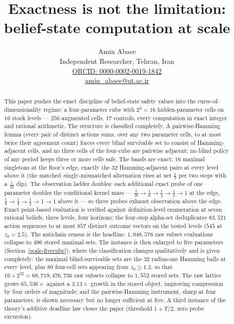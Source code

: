 \documentclass[10pt,twocolumn]{article}
\theoremstyle{plain}
\theoremstyle{definition}
\theoremstyle{remark}
\begin{document}
\title{Exactness is not the limitation: belief-state computation at scale}

\author{Amin Abaee\\[0.35em]
{\small Independent Researcher, Tehran, Iran}\\[0.55em]
{\small\href{https://orcid.org/0000-0002-0019-1842}{ORCID: 0000-0002-0019-1842}}\\[0.3em]
{\small\href{mailto:amin\_abaee@ut.ac.ir}{amin\_abaee@ut.ac.ir}}}
\maketitle

\begin{abstract}
This paper pushes the exact discipline of belief-state safety values into the curse-of-dimensionality regime: a four-parameter cube with
\(2^{4} = 16\) hidden-parameter cells on \(16\) stock levels ---
\(256\) augmented cells, \(17\) controls, every computation in exact
integer and rational arithmetic. The structure is classified
completely. A pairwise-Hamming lemma (every pair of distinct actions
sums, over any two parameter cells, to at most twice their agreement
count) forces every blind survivable set to consist of
Hamming-adjacent cells, and no three cells of the four-cube are
pairwise adjacent: no blind policy of any period keeps three or more
cells safe. The bands are exact: \(16\) maximal singletons at the
floor's edge, exactly the \(32\) Hamming-adjacent pairs at every level
above it (the matched--singly-mismatched alternation rises at net
\(\tfrac15\) per two steps with a \(\tfrac1{10}\) dip). The
observation ladder doubles: each additional exact probe of one
parameter doubles the conditional kernel mass ---
\(\tfrac1{16} \to \tfrac18 \to \tfrac14 \to \tfrac12 \to 1\) at the
edge, \(\tfrac18 \to \tfrac14 \to \tfrac12 \to 1 \to 1\) above it ---
so three probes exhaust observation above the edge. Exact point-based
evaluation is verified against definition-level enumeration at seven
rational beliefs, three levels, four horizons; the four-step alpha-set
deduplicates \(83{,}521\) action sequences to at most \(857\) distinct
outcome vectors on the tested levels (\(545\) at \(z_0=2.5\)). The antichain census is the headline: \(1{,}048{,}576\) raw subset evaluations collapse to \(496\) stored maximal sets. The instance is then enlarged to five parameters (Section~\ref{scale-fivecube}), where the classification changes qualitatively and is given completely: the maximal blind-survivable sets are the \(32\) radius-one Hamming balls at every level, plus \(80\) four-cell sets appearing from \(z_{0} \ge 1.3\), so that \(16 \times 2^{32} = 68{,}719{,}476{,}736\) raw subsets collapse to \(1{,}552\) stored sets. The raw lattice grows \(65{,}536\times\) against a \(3.13\times\) growth in the stored object, improving compression by four orders of magnitude; and the pairwise-Hamming instrument, sharp at four parameters, is shown necessary but no longer sufficient at five. A third instance of the theory's additive deadline law closes the paper (threshold \(1 + T/2\), zero probe excursion).
\end{abstract}
\end{document}
